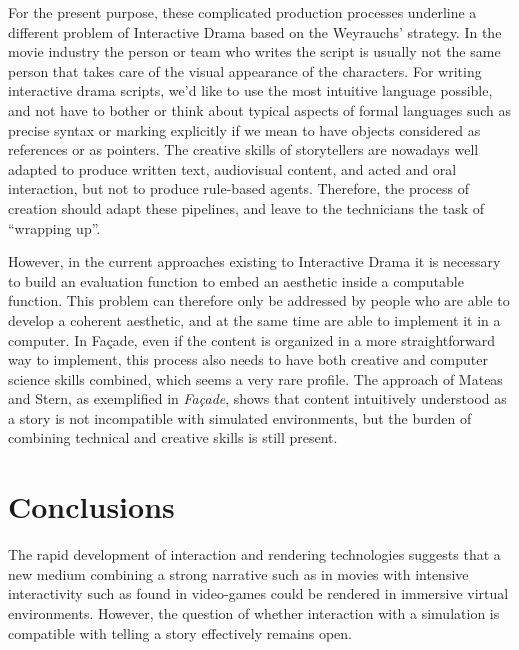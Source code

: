 \documentclass[
		twoside,openright,titlepage,numbers=noenddot,manychapters,
		headinclude,%
                footinclude=false,cleardoublepage=empty,
                BCOR=5mm,
		fontsize=11pt, %
                 enabledeprecatedfontcommands]{scrreprt}
\begin{document}
For the present purpose, these complicated production processes underline a different problem of Interactive Drama  based on the Weyrauchs' strategy. In the movie industry the person or team who writes the script is usually not the same person that takes care of the visual appearance of the characters. For writing interactive drama scripts,  we'd like to use the most intuitive language possible, and not have to bother or think about typical aspects of formal languages such as precise syntax or marking explicitly if we mean to have objects considered as references or as pointers. The creative skills of storytellers are nowadays well adapted to produce written text, audiovisual content, and acted and oral interaction, but not to produce rule-based agents. Therefore, the process of creation should adapt these pipelines, and leave to the technicians the task of ``wrapping up''. 


However, in the current approaches existing to Interactive Drama it is necessary to build an evaluation function to embed an aesthetic inside a computable function. This problem can therefore only be addressed by people who are able to develop a coherent aesthetic, and at the same time are able to implement it in a computer. In Façade, even if the content is organized in a more straightforward way to implement, this process also needs to have both creative and computer science skills combined, which seems a very rare profile. The approach of Mateas and Stern, as exemplified in \emph{Façade}, shows that content intuitively understood as a story is not incompatible with simulated environments, but the burden of combining technical and creative skills is still present. 




\section{Conclusions}
The rapid development of interaction and rendering technologies suggests that a new medium combining a strong narrative such as in movies with intensive interactivity such as found in video-games could be rendered in immersive virtual environments. However, the question of whether interaction with a simulation is compatible with telling a story effectively remains open.
\end{document}
